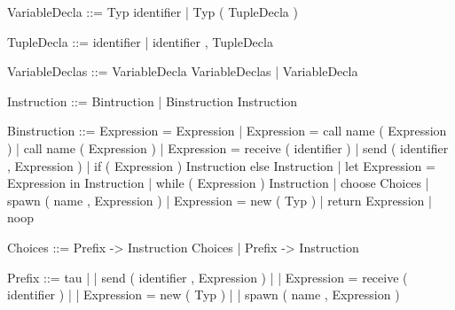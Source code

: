 \documentclass[11pt]{report}
\begin{document}
\begin{verbnobox}[\normalfont]
VariableDecla ::= Typ identifier | Typ ( TupleDecla )
\end{verbnobox}
\vspace*{3pt}

\begin{verbnobox}[\normalfont]
TupleDecla ::= identifier | identifier , TupleDecla
\end{verbnobox}
\vspace*{3pt}

\begin{verbnobox}[\normalfont]
VariableDeclas ::= VariableDecla VariableDeclas | VariableDecla
\end{verbnobox}
\vspace*{3pt}

\begin{verbnobox}[\normalfont]
Instruction ::= Bintruction | Binstruction Instruction
\end{verbnobox}
\vspace*{3pt}

\begin{verbnobox}[\normalfont]
Binstruction ::= Expression = Expression 
                 | Expression = call name ( Expression )
                 | call name ( Expression )
                 | Expression = receive ( identifier )
                 | send ( identifier , Expression )
                 | if ( Expression ) { Instruction } else { Instruction }
                 | let Expression = Expression in { Instruction }
                 | while ( Expression ) { Instruction }
                 | choose { Choices }
                 | spawn ( name , Expression )
                 | Expression = new ( Typ )
                 | return Expression
                 | noop
\end{verbnobox}
\vspace*{3pt}

\begin{verbnobox}[\normalfont]
Choices ::= Prefix -> { Instruction } Choices | Prefix -> { Instruction }
\end{verbnobox}
\vspace*{3pt}

\begin{verbnobox}[\normalfont]
Prefix ::= tau
         | | send ( identifier , Expression )
         | | Expression = receive ( identifier )
         | | Expression = new ( Typ )
         | | spawn ( name , Expression )
\end{verbnobox}
\vspace*{3pt}
\end{document}
